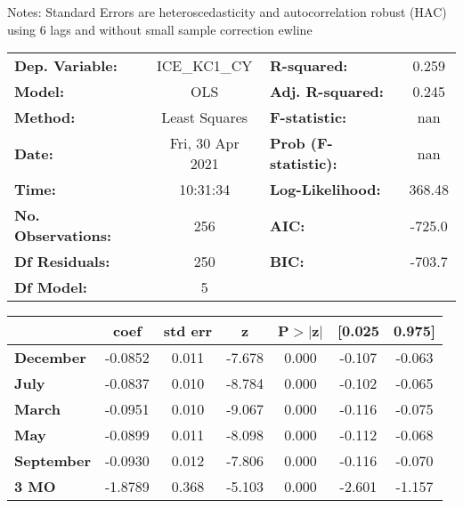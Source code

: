 Notes: \newline
 [1] Standard Errors are heteroscedasticity and autocorrelation robust (HAC) using 6 lags and without small sample correction
ewline\begin{center}
\begin{tabular}{lclc}
\toprule
\textbf{Dep. Variable:}    &   ICE\_KC1\_CY   & \textbf{  R-squared:         } &     0.259   \\
\textbf{Model:}            &       OLS        & \textbf{  Adj. R-squared:    } &     0.245   \\
\textbf{Method:}           &  Least Squares   & \textbf{  F-statistic:       } &       nan   \\
\textbf{Date:}             & Fri, 30 Apr 2021 & \textbf{  Prob (F-statistic):} &      nan    \\
\textbf{Time:}             &     10:31:34     & \textbf{  Log-Likelihood:    } &    368.48   \\
\textbf{No. Observations:} &         256      & \textbf{  AIC:               } &    -725.0   \\
\textbf{Df Residuals:}     &         250      & \textbf{  BIC:               } &    -703.7   \\
\textbf{Df Model:}         &           5      & \textbf{                     } &             \\
\bottomrule
\end{tabular}
\begin{tabular}{lcccccc}
                   & \textbf{coef} & \textbf{std err} & \textbf{z} & \textbf{P$> |$z$|$} & \textbf{[0.025} & \textbf{0.975]}  \\
\midrule
\textbf{December}  &      -0.0852  &        0.011     &    -7.678  &         0.000        &       -0.107    &       -0.063     \\
\textbf{July}      &      -0.0837  &        0.010     &    -8.784  &         0.000        &       -0.102    &       -0.065     \\
\textbf{March}     &      -0.0951  &        0.010     &    -9.067  &         0.000        &       -0.116    &       -0.075     \\
\textbf{May}       &      -0.0899  &        0.011     &    -8.098  &         0.000        &       -0.112    &       -0.068     \\
\textbf{September} &      -0.0930  &        0.012     &    -7.806  &         0.000        &       -0.116    &       -0.070     \\
\textbf{3 MO}      &      -1.8789  &        0.368     &    -5.103  &         0.000        &       -2.601    &       -1.157     \\

\end{tabular}
\end{center}
